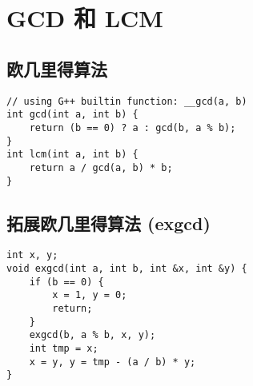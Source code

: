 \section{GCD 和 LCM}
\subsection{欧几里得算法}
\begin{verbatim}
// using G++ builtin function: __gcd(a, b)
int gcd(int a, int b) {
    return (b == 0) ? a : gcd(b, a % b);
}
int lcm(int a, int b) {
    return a / gcd(a, b) * b;
}
\end{verbatim}

\subsection{拓展欧几里得算法 (exgcd)}
\begin{verbatim}
int x, y;
void exgcd(int a, int b, int &x, int &y) {
    if (b == 0) {
        x = 1, y = 0;
        return;
    }
    exgcd(b, a % b, x, y);
    int tmp = x;
    x = y, y = tmp - (a / b) * y;
}
\end{verbatim}